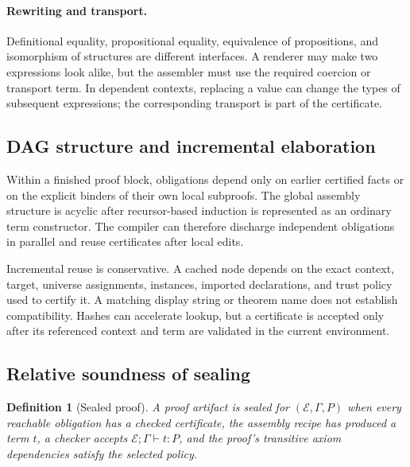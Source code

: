 \documentclass[11pt,a4paper]{article}
\newcommand{\E}{\mathcal E}
\newtheorem{definition}[proposition]{Definition}
\theoremstyle{remark}
\begin{document}
\paragraph{Rewriting and transport.}
Definitional equality, propositional equality, equivalence of propositions, and isomorphism of structures are different interfaces. A renderer may make two expressions look alike, but the assembler must use the required coercion or transport term. In dependent contexts, replacing a value can change the types of subsequent expressions; the corresponding transport is part of the certificate.

\subsection{DAG structure and incremental elaboration}
Within a finished proof block, obligations depend only on earlier certified facts or on the explicit binders of their own local subproofs. The global assembly structure is acyclic after recursor-based induction is represented as an ordinary term constructor. The compiler can therefore discharge independent obligations in parallel and reuse certificates after local edits.

Incremental reuse is conservative. A cached node depends on the exact context, target, universe assignments, instances, imported declarations, and trust policy used to certify it. A matching display string or theorem name does not establish compatibility. Hashes can accelerate lookup, but a certificate is accepted only after its referenced context and term are validated in the current environment.

\subsection{Relative soundness of sealing}
\begin{definition}[Sealed proof]
A proof artifact is sealed for $(\E,\Gamma,P)$ when every reachable obligation has a checked certificate, the assembly recipe has produced a term $t$, a checker accepts $\E;\Gamma\vdash t:P$, and the proof's transitive axiom dependencies satisfy the selected policy.
\end{definition}
\end{document}

